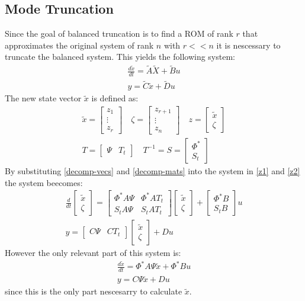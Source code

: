\subsection{Mode Truncation}
Since the goal of balanced truncation is to find a ROM of rank \(r\) that approximates the original system of rank \(n\) with \(r << n\) it is nescessary to truncate the balanced system.
This yields the following system:
\begin{gather}
\frac{d\tilde{x}}{dt} = \tilde{A}\tilde{X} + \tilde{B}u \\
y = \tilde{C}\tilde{x} + \tilde{D}u
\end{gather}
The new state vector \(\tilde{x}\) is defined as:
\begin{gather}
\tilde{x} = \begin{bmatrix}
z_1 \\
\vdots \\
z_r
\end{bmatrix} \quad 
\zeta = \begin{bmatrix}
z_{r+1} \\
\vdots \\
z_n
\end{bmatrix} \quad
z = \begin{bmatrix}
\tilde{x} \\
\zeta
\end{bmatrix} \label{decomp-vecs}\\
T = \begin{bmatrix}
\Psi & T_t
\end{bmatrix} \quad
T^{-1} = S = \begin{bmatrix}
\Phi^{*} \\
S_t
\end{bmatrix} \label{decomp-mats}
\end{gather}
By substituting \ref{decomp-vecs} and \ref{decomp-mats} into the system in \ref{z1} and \ref{z2} the system beecomes:
\begin{gather}
\frac{d}{dt} \begin{bmatrix}
\tilde{x} \\
\zeta
\end{bmatrix} = \begin{bmatrix}
\Phi^{*}A\Psi & \Phi^{*}AT_t \\
S_tA\Psi & S_tAT_t
\end{bmatrix} \begin{bmatrix}
\tilde{x} \\
\zeta
\end{bmatrix}
+ \begin{bmatrix}
\Phi^{*}B \\
S_tB
\end{bmatrix} u \\
y = \begin{bmatrix}
C \Psi & CT_t
\end{bmatrix} \begin{bmatrix}
\tilde{x} \\
\zeta
\end{bmatrix} + Du
\end{gather}
However the only relevant part of this system is:
\begin{gather}
\frac{d\tilde{x}}{dt} = \Phi^{*}A\Psi\tilde{x} + \Phi^{*}Bu \\
y = C\Psi\tilde{x} + Du 
\end{gather}
since this is the only part nescesarry to calculate \(\tilde{x}\).
\cite{brunton_kutz_2019e}

